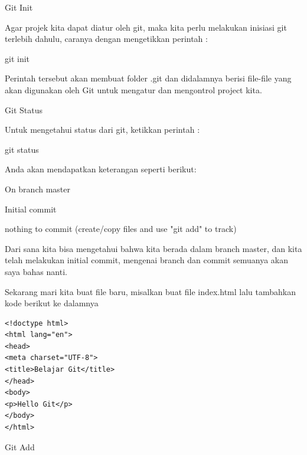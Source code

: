  
\noindent 
 \hspace*{0.5in} Git Init \par
\noindent 
Agar projek kita dapat diatur oleh git, maka kita perlu melakukan inisiasi git terlebih dahulu, caranya dengan mengetikkan perintah : \par
\vspace{\baselineskip}
\noindent 
 \hspace*{0.5in} git init \par
\noindent 
Perintah tersebut akan membuat folder .git dan didalamnya berisi file-file yang akan digunakan oleh Git untuk mengatur dan mengontrol project kita. \par
\vspace{\baselineskip}
\noindent 
 \hspace*{0.5in} Git Status \par
\noindent 
Untuk mengetahui status dari git, ketikkan perintah : \par
\vspace{\baselineskip}
\noindent 
 \hspace*{0.5in} git status \par
\noindent 
Anda akan mendapatkan keterangan seperti berikut: \par
\vspace{\baselineskip}
\noindent 
 \hspace*{0.5in} On branch master \par
\noindent 
 \hspace*{0.5in} Initial commit \par
\noindent 
 \hspace*{0.5in} nothing to commit (create/copy files and use "git add" to track) \par
\noindent 
Dari sana kita bisa mengetahui bahwa kita berada dalam branch master, dan kita telah melakukan initial commit, mengenai branch dan commit semuanya akan saya bahas nanti. \par
\noindent 
Sekarang mari kita buat file baru, misalkan buat file index.html lalu tambahkan kode berikut ke dalamnya \par
\begin{verbatim}
<!doctype html>
<html lang="en">
<head>
<meta charset="UTF-8"> 
<title>Belajar Git</title>
</head> 
<body> 
<p>Hello Git</p>
</body> 
</html> 
\end{verbatim}
\vspace{\baselineskip}
 \hspace*{0.5in} Git Add \par
